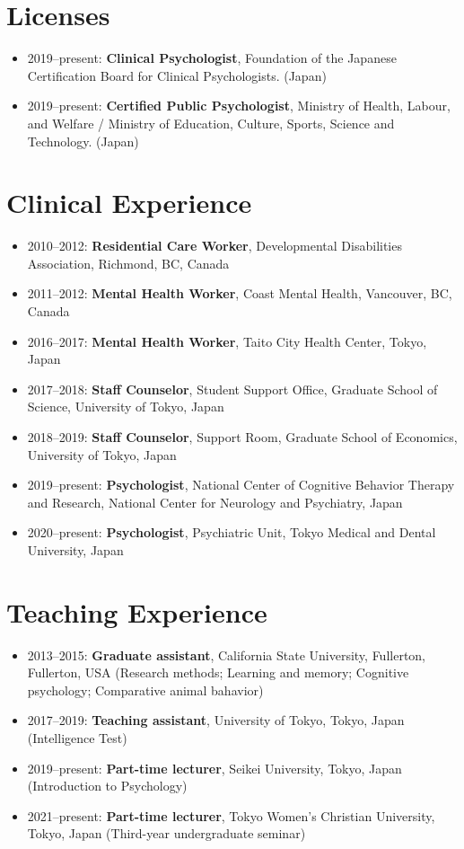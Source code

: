 \documentclass{article}
\begin{document}
\section{Licenses}
\begin{itemize}
	\item 2019--present: \textbf{Clinical Psychologist}, Foundation of the Japanese Certification Board for Clinical Psychologists. (Japan)
	\item 2019--present: \textbf{Certified Public Psychologist}, Ministry of Health, Labour, and Welfare / Ministry of Education, Culture, Sports, Science and Technology. (Japan)
\end{itemize} 

\section{Clinical Experience}
\begin{itemize}
	\item 2010--2012: \textbf{Residential Care Worker}, Developmental Disabilities Association, Richmond, BC, Canada
	\item 2011--2012: \textbf{Mental Health Worker}, Coast Mental Health, Vancouver, BC, Canada
	\item 2016--2017: \textbf{Mental Health Worker}, Taito City Health Center, Tokyo, Japan
	\item 2017--2018: \textbf{Staff Counselor}, Student Support Office, Graduate School of Science, University of Tokyo, Japan
	\item 2018--2019: \textbf{Staff Counselor}, Support Room, Graduate School of Economics, University of Tokyo, Japan
	\item 2019--present: \textbf{Psychologist}, National Center of Cognitive Behavior Therapy and Research, National Center for Neurology and Psychiatry, Japan
	\item 2020--present: \textbf{Psychologist}, Psychiatric Unit, Tokyo Medical and Dental University, Japan
\end{itemize}

\section{Teaching Experience}
\begin{itemize}
	\item 2013--2015: \textbf{Graduate assistant}, California State University, Fullerton, Fullerton, USA (Research methods; Learning and memory; Cognitive psychology; Comparative animal bahavior)
	\item 2017--2019: \textbf{Teaching assistant}, University of Tokyo, Tokyo, Japan (Intelligence Test)
	\item 2019--present: \textbf{Part-time lecturer}, Seikei University, Tokyo, Japan (Introduction to Psychology)
	\item 2021--present: \textbf{Part-time lecturer}, Tokyo Women's Christian University, Tokyo, Japan (Third-year undergraduate seminar)
\end{itemize}
\end{document}
